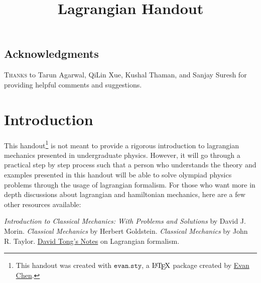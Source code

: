 \documentclass[11pt]{scrartcl}
\title{Lagrangian Handout}
\begin{document}
\maketitle

\subsection*{Acknowledgments}
\textsc{Thanks} to Tarun Agarwal, QiLin Xue, Kushal Thaman, and Sanjay Suresh for providing helpful comments and suggestions. 
\section{Introduction}
This handout\footnote{This handout was created with $\texttt{evan.sty}$, a $\text\LaTeX$ package created by \href{https://github.com/vEnhance/dotfiles/blob/master/texmf/tex/latex/evan/evan.sty}{Evan Chen}.} is not meant to provide a rigorous introduction to lagrangian mechanics presented in undergraduate physics. However, it will go through a practical step by step process such that a person who understands the theory and examples presented in this handout will be able to solve olympiad physics problems through the usage of lagrangian formalism. For those who want more in depth discussions about lagrangian and hamiltonian mechanics, here are a few other resources available:
\begin{itemize}
    \ii \textit{Introduction to Classical Mechanics: With Problems and Solutions} by David J. Morin.
    \ii \textit{Classical Mechanics} by Herbert Goldstein.
    \ii \textit{Classical Mechanics} by John R. Taylor.
    \ii \href{https://www.damtp.cam.ac.uk/user/tong/dynamics/two.pdf}{David Tong's Notes} on Lagrangian formalism. 
\end{itemize}
\end{document}
